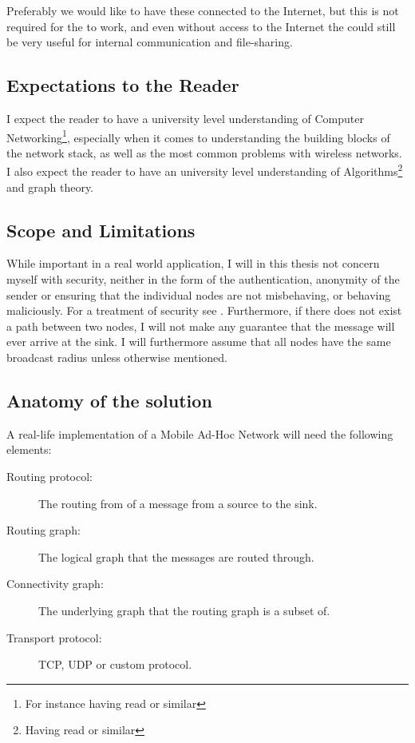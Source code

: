 Preferably we would like to have these \manet connected to the Internet, but this is not required for the \manet to work, and even without access to the Internet the \manet could still  be very useful for internal communication and file-sharing. 
 

\subsection{Expectations to the Reader}
I expect the reader to have a university level understanding of Computer Networking\footnote{For instance having read \cite{ComNet} or similar}, especially when it comes to understanding the building blocks of the network stack, as well as the most common problems with wireless networks. I also expect the reader to have an university level understanding of Algorithms\footnote{Having read \cite{algo} or similar} and graph theory.

\subsection{Scope and Limitations}
While important in a real world application, I will in this thesis not concern myself with security, neither in the form of the authentication, anonymity of the sender or ensuring that the individual nodes are not misbehaving, or behaving maliciously. For a treatment of security see \cite{trustedRouting}. Furthermore, if there does not exist a path between two nodes, I will not make any guarantee that the message will ever arrive at the sink. I will furthermore assume that all nodes have the same broadcast radius unless otherwise mentioned.

\subsection{Anatomy of the solution}
A real-life implementation of a Mobile Ad-Hoc Network will need the following elements:
\begin{description}
\item[Routing protocol:] The routing from of a message from a source to the sink.
\item[Routing graph:] The logical graph that the messages are routed through.
\item[Connectivity graph:] The underlying graph that the routing graph is a subset of.
\item[Transport protocol:] TCP, UDP or custom protocol.
\end{description}

